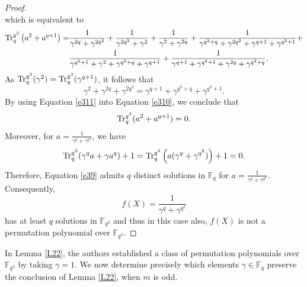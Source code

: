 \documentclass[11pt]{amsart}
\theoremstyle{plain}
\numberwithin{equation}{section}
\theoremstyle{definition}
\newcommand{\F}{\mathbb F}
\def\Tr{{\rm Tr}}
\begin{document}
\begin{proof}
\begin{equation*}
\end{equation*}
which is equivalent to
\begin{equation}\label{e310}
\begin{split}
\Tr_{q}^{q^3}\left(a^2+a^{q+1}\right)=&
\frac{1}{\gamma^{2q}+\gamma^{2q^2}}+\frac{1}{\gamma^{2q^2}+\gamma^{2}}+\frac{1}{\gamma^{2}+\gamma^{2q}}+\frac{1}{\gamma^{q^2+q}+\gamma^{2q^2}+\gamma^{q+1}+\gamma^{q^2+1}}+\\&\frac{1}{\gamma^{q^2+1}+\gamma^{2}+\gamma^{q^2+q}+\gamma^{q+1}}+\frac{1}{\gamma^{q+1}+\gamma^{q^2+1}+\gamma^{2q}+\gamma^{q^2+q}}.
\end{split}
\end{equation}
As $\Tr_{q}^{q^3}(\gamma^2)=\Tr_{q}^{q^3}(\gamma^{q+1})$, it follows that 
\begin{equation}\label{e311}
    \gamma^2+\gamma^{2q}+\gamma^{2q^2}=\gamma^{q+1}+\gamma^{q^2+q}+\gamma^{q^2+1}.
\end{equation}
By using Equation \eqref{e311} into Equation \eqref{e310}, we conclude that
$$\Tr_{q}^{q^3}(a^2+a^{q+1})=0.$$
Moreover, for $a=\frac{1}{\gamma^q+\gamma^{q^2}}$, we have 
$$\Tr_{q}^{q^3}(\gamma^qa+\gamma a^q)+1=\Tr_{q}^{q^3}\left(a(\gamma^q+\gamma^{q^2})\right)+1=0.$$  Therefore, Equation \eqref{e39} admits $q$ distinct solutions in $\F_q$ for $a=\frac{1}{\gamma^q+\gamma^{q^2}}.$ Consequently, $$f(X)=\frac{1}{\gamma^q+\gamma^{q^2}}$$ has at least $q$ solutions in $\F_{q^3}$ and thus in this case also, $f(X)$ is not a permutation polynomial over $\F_{q^3}.$

\end{proof}

In Lemma \ref{L22}, the authors established a class of permutation polynomials over $\F_{q^2}$ by taking $\gamma=1$. We now  determine precisely which elements $\gamma \in \F_q$ preserve the conclusion of Lemma \ref{L22}, when $m$ is odd. 
\end{document}

